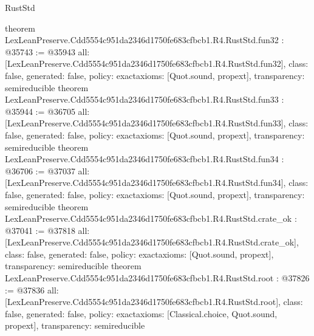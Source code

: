 \begin{lexlean}{RustStd}
\begin{coremodule}
{}
theorem LexLeanPreserve.Cdd5554c951da2346d1750fe683cfbcb1.R4.RustStd.fun32 : @35743 := @35943 {
  all: [LexLeanPreserve.Cdd5554c951da2346d1750fe683cfbcb1.R4.RustStd.fun32],
  class: false,
  generated: false,
  policy: exact{axioms: [Quot.sound, propext]},
  transparency: semireducible
}
theorem LexLeanPreserve.Cdd5554c951da2346d1750fe683cfbcb1.R4.RustStd.fun33 : @35944 := @36705 {
  all: [LexLeanPreserve.Cdd5554c951da2346d1750fe683cfbcb1.R4.RustStd.fun33],
  class: false,
  generated: false,
  policy: exact{axioms: [Quot.sound, propext]},
  transparency: semireducible
}
theorem LexLeanPreserve.Cdd5554c951da2346d1750fe683cfbcb1.R4.RustStd.fun34 : @36706 := @37037 {
  all: [LexLeanPreserve.Cdd5554c951da2346d1750fe683cfbcb1.R4.RustStd.fun34],
  class: false,
  generated: false,
  policy: exact{axioms: [Quot.sound, propext]},
  transparency: semireducible
}
theorem LexLeanPreserve.Cdd5554c951da2346d1750fe683cfbcb1.R4.RustStd.crate_ok : @37041 := @37818 {
  all: [LexLeanPreserve.Cdd5554c951da2346d1750fe683cfbcb1.R4.RustStd.crate_ok],
  class: false,
  generated: false,
  policy: exact{axioms: [Quot.sound, propext]},
  transparency: semireducible
}
theorem LexLeanPreserve.Cdd5554c951da2346d1750fe683cfbcb1.R4.RustStd.root : @37826 := @37836 {
  all: [LexLeanPreserve.Cdd5554c951da2346d1750fe683cfbcb1.R4.RustStd.root],
  class: false,
  generated: false,
  policy: exact{axioms: [Classical.choice, Quot.sound, propext]},
  transparency: semireducible
}


\end{coremodule}
\end{lexlean}
